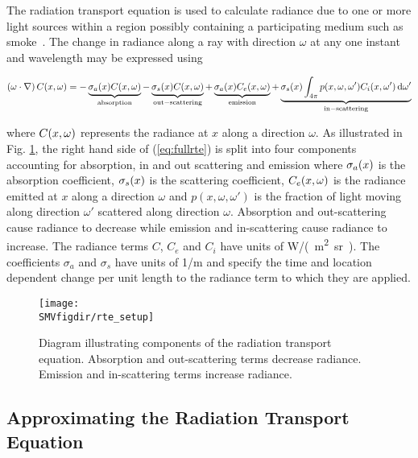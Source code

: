 The radiation transport equation is used to calculate radiance due
to one or more light sources within a region possibly containing a
participating medium such as smoke~\cite{Siegel:2001}. The change
in radiance along a ray with direction $\omega$ at any one instant
and wavelength may be expressed using

\begin{eqnarray}
\label{eq:fullrte}
 \left(\omega\cdot\nabla\right)C(x,\omega) =
-\underbrace{\sigma_a(x)C(x,\omega)}_\mathrm{absorption}-\underbrace{\sigma_s(x)C(x,\omega)}_\mathrm{out-scattering}
+ \underbrace{\sigma_a(x)C_e(x,\omega)}_\mathrm{emission} +
\underbrace{\sigma_s(x)\int_{4\pi}p(x,\omega,\omega')C_i(x,\omega')\,\mbox{d}\omega'}_\mathrm{in-scattering}
\end{eqnarray}

\noindent where  $C(x,\omega)$ represents the  radiance at $x$ along a
direction $\omega$. As illustrated in Fig. \ref{figRadiance}, the
right hand side of (\ref{eq:fullrte}) is split into four
components accounting for absorption, in and out scattering and
emission where $\sigma_a(x)$ is the absorption coefficient, $\sigma_s(x)$ is
the scattering coefficient, $C_e(x,\omega)$ is the radiance emitted at $x$
along a direction $\omega$ and $p(x,\omega,\omega')$ is the
fraction of light moving along direction $\omega'$ scattered along
direction $\omega$. Absorption and out-scattering cause radiance
to decrease while emission and in-scattering cause radiance to
increase. The radiance terms $C$, $C_e$ and $C_i$ have units of
\si{W/(m^2.sr)}. The coefficients $\sigma_a$ and $\sigma_s$ have
units of \si{1/m} and specify the time and location dependent
change per unit length to the radiance term to which they are
applied.

\begin{figure}[bph]
\begin{center}
\texttt{[image: \\SMVfigdir/rte\_setup]}
\end{center}
\caption[Diagram illustrating components of the radiation
transport equation]{Diagram illustrating components of the
radiation transport equation.  Absorption and out-scattering terms
decrease radiance.  Emission and in-scattering terms increase
radiance.} \label{figRadiance}
\end{figure}


\subsection{Approximating the Radiation Transport Equation}

